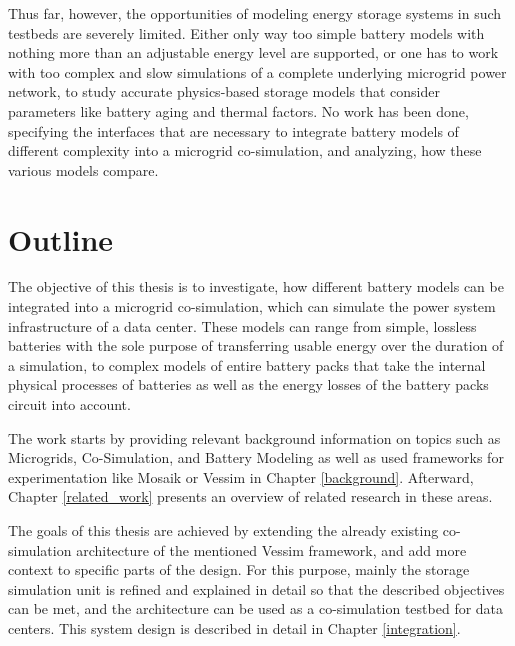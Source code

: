 Thus far, however, the opportunities of modeling energy storage systems in such testbeds are severely limited. Either only way too simple battery models with nothing more than an adjustable energy level are supported, or one has to work with too complex and slow simulations of a complete underlying microgrid power network, to study accurate physics-based storage models that consider parameters like battery aging and thermal factors. No work has been done, specifying the interfaces that are necessary to integrate battery models of different complexity into a microgrid co-simulation, and analyzing, how these various models compare.

\section{Outline}
The objective of this thesis is to investigate, how different battery models can be integrated into a microgrid co-simulation, which can simulate the power system infrastructure of a data center. These models can range from simple, lossless batteries with the sole purpose of transferring usable energy over the duration of a simulation, to complex models of entire battery packs that take the internal physical processes of batteries as well as the energy losses of the battery packs circuit into account.

The work starts by providing relevant background information on topics such as Microgrids, Co-Simulation, and Battery Modeling as well as used frameworks for experimentation like Mosaik \cite{mosaik} or Vessim \cite{vessim} in Chapter \ref{background}. Afterward, Chapter \ref{related_work} presents an overview of related research in these areas.

The goals of this thesis are achieved by extending the already existing co-simulation architecture of the mentioned Vessim framework, and add more context to specific parts of the design. For this purpose, mainly the storage simulation unit is refined and explained in detail so that the described objectives can be met, and the architecture can be used as a co-simulation testbed for data centers. This system design is described in detail in Chapter \ref{integration}.

